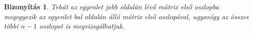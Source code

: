 \documentclass[a4paper,12pt,twoside]{book}
\newcommand{\vek}[1]{\mathbf{#1}} %
\newcommand{\ve}[2]{\mathbf{#1}_{#2}} %
\newcommand{\linkomb}[3]{#2_1\vek{#1}_{1} + #2_2\vek{#1}_{2} + \ldots + #2_{#3}\vek{#1}_{#3}}
\theoremstyle{break}
\newtheorem{bizNL}[biz]{Bizonyítás}
\begin{document}
\begin{bizNL}

Tehát az egyenlet jobb oldalán lévő mátrix első oszlopba megegyezik az egyenlet bal oldalán álló mátrix első oszlopával, ugyanígy az összes többi $n-1$ oszlopot is megvizsgálhatjuk.
\end{bizNL}
\end{document}
